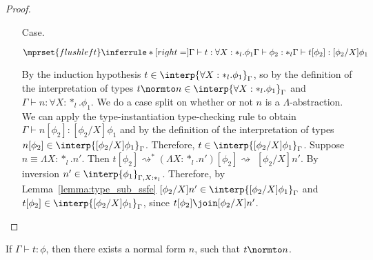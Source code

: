 \begin{proof}
\begin{itemize}
\item[Case.]\ \\
  \begin{center}
    \begin{math}
      $$\mprset{flushleft}
      \inferrule* [right=] {
        \Gamma \vdash t:\forall X:*_l.\phi_1
        \\
        \Gamma \vdash \phi_2:*_l
      }{\Gamma \vdash t[\phi_2]: [\phi_2/X]\phi_1}
    \end{math}
  \end{center}
  By the induction hypothesis $t \in \interp{\forall X:*_l.\phi_1}_\Gamma$, so by the 
  definition of the interpretation of types 
  $t \normto n \in \interp{\forall X:*_l.\phi_1}_\Gamma$ and
  $\Gamma \vdash n:\forall X:*_l.\phi_1$.  We do a case 
  split on whether or not $n$ is a $\Lambda$-abstraction. We can apply the
  type-instantiation type-checking rule to obtain 
  $\Gamma \vdash n[\phi_2]:[\phi_2/X]\phi_1$ and by the 
  definition of the interpretation of types 
  $n[\phi_2] \in \interp{[\phi_2/X]\phi_1}_\Gamma$. Therefore, 
  $t \in \interp{[\phi_2/X]\phi_1}_\Gamma$.  Suppose $n \equiv \Lambda X:*_l.n'$.  
  Then 
  $t[\phi_2] \rightsquigarrow^{*} (\Lambda X:*_l.n')[\phi_2] \rightsquigarrow $
  $ [\phi_2/X]n'$.  By inversion
  $n' \in \interp{\phi_1}_{\Gamma,X:*_l}$. Therefore, by
  Lemma~\ref{lemma:type_sub_ssfe} $[\phi_2/X]n' \in \interp{[\phi_2/X]\phi_1}_{\Gamma}$ and
  $t[\phi_2] \in \interp{[\phi_2/X]\phi_1}_{\Gamma}$, since $t[\phi_2] \join [\phi_2/X]n'$.
\end{itemize}
\end{proof}
\begin{corollary}[Normalization]
  If $\Gamma \vdash t:\phi$, then there exists a normal form $n$, such
  that $t \normto n$.
\end{corollary}

